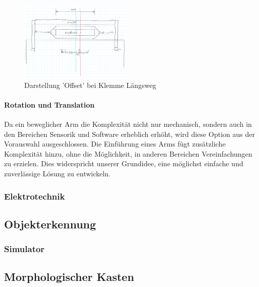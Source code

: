         \begin{figure}[h!]
            \centering
            \includegraphics[width=0.48\textwidth]{img/konzeptfindung/Klemme_Langsweg_off_center.png}
            \caption{Darstellung 'Offset' bei Klemme Längsweg}
        \label{img:konzept_zentrierung_3}
        \end{figure}  
                        
        \newpage         
        \paragraph{Rotation und Translation}
        Da ein beweglicher Arm die Komplexität nicht nur mechanisch, sondern auch in den Bereichen Sensorik und Software erheblich erhöht, wird diese Option aus der Vorauswahl ausgeschlossen. Die Einführung eines Arms fügt zusätzliche Komplexität hinzu, ohne die Möglichkeit, in anderen Bereichen Vereinfachungen zu erzielen. Dies widerspricht unserer Grundidee, eine möglichst einfache und zuverlässige Lösung zu entwickeln.

\subsubsection{Elektrotechnik}
    \paragraph{}

\subsection{Objekterkennung}



\subsubsection{Simulator}
    \paragraph{}

\subsection{Morphologischer Kasten}
        